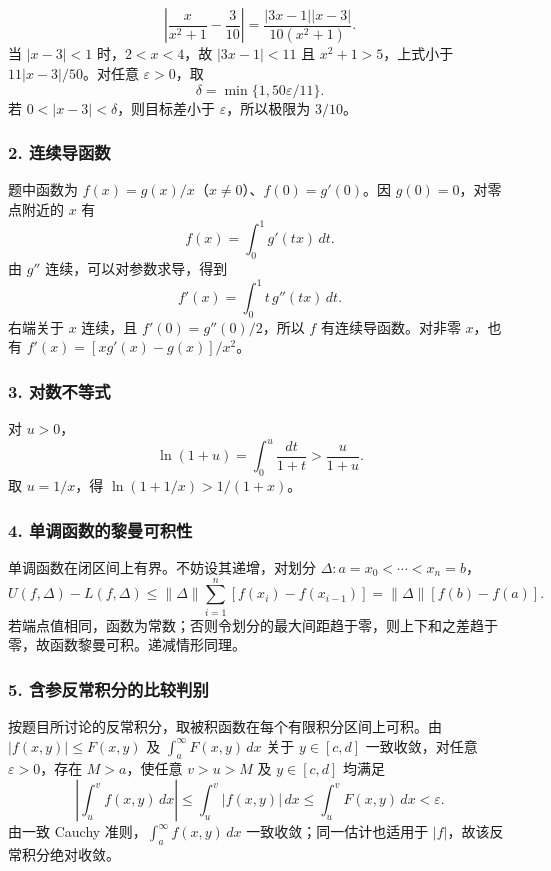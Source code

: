 \documentclass[11pt,fontset=fandol]{ctexart}
\begin{document}
\[
\left|\frac{x}{x^2+1}-\frac3{10}\right|
=\frac{|3x-1||x-3|}{10(x^2+1)}.
\] 当 \(|x-3|<1\) 时，\(2<x<4\)，故 \(|3x-1|<11\) 且
\(x^2+1>5\)，上式小于 \(11|x-3|/50\)。对任意 \(\varepsilon>0\)，取 \[
\delta=\min\{1,50\varepsilon/11\}.
\] 若 \(0<|x-3|<\delta\)，则目标差小于 \(\varepsilon\)，所以极限为
\(3/10\)。

\subsubsection{2. 连续导函数}\label{ux8fdeux7eedux5bfcux51fdux6570}

题中函数为 \(f(x)=g(x)/x\)（\(x\neq0\)）、\(f(0)=g'(0)\)。因
\(g(0)=0\)，对零点附近的 \(x\) 有 \[
f(x)=\int_0^1g'(tx)\,dt.
\] 由 \(g''\) 连续，可以对参数求导，得到 \[
f'(x)=\int_0^1t\,g''(tx)\,dt.
\] 右端关于 \(x\) 连续，且 \(f'(0)=g''(0)/2\)，所以 \(f\)
有连续导函数。对非零 \(x\)，也有 \(f'(x)=[xg'(x)-g(x)]/x^2\)。

\subsubsection{3. 对数不等式}\label{ux5bf9ux6570ux4e0dux7b49ux5f0f}

对 \(u>0\)， \[
\ln(1+u)=\int_0^u\frac{dt}{1+t}>\frac{u}{1+u}.
\] 取 \(u=1/x\)，得 \(\boxed{\ln(1+1/x)>1/(1+x)}\)。

\subsubsection{4.
单调函数的黎曼可积性}\label{ux5355ux8c03ux51fdux6570ux7684ux9eceux66fcux53efux79efux6027}

单调函数在闭区间上有界。不妨设其递增，对划分
\(\Delta:a=x_0<\cdots<x_n=b\)， \[
U(f,\Delta)-L(f,\Delta)
\leq\|\Delta\|\sum_{i=1}^n[f(x_i)-f(x_{i-1})]
=\|\Delta\|[f(b)-f(a)].
\]
若端点值相同，函数为常数；否则令划分的最大间距趋于零，则上下和之差趋于零，故函数黎曼可积。递减情形同理。

\subsubsection{5.
含参反常积分的比较判别}\label{ux542bux53c2ux53cdux5e38ux79efux5206ux7684ux6bd4ux8f83ux5224ux522b}

按题目所讨论的反常积分，取被积函数在每个有限积分区间上可积。由
\(|f(x,y)|\leq F(x,y)\) 及 \(\int_a^{\infty}F(x,y)\,dx\) 关于
\(y\in[c,d]\) 一致收敛，对任意 \(\varepsilon>0\)，存在 \(M>a\)，使任意
\(v>u>M\) 及 \(y\in[c,d]\) 均满足 \[
\left|\int_u^vf(x,y)\,dx\right|
\leq\int_u^v|f(x,y)|\,dx
\leq\int_u^vF(x,y)\,dx<\varepsilon.
\] 由一致 Cauchy 准则，\(\int_a^{\infty}f(x,y)\,dx\)
一致收敛；同一估计也适用于 \(|f|\)，故该反常积分绝对收敛。
\end{document}
